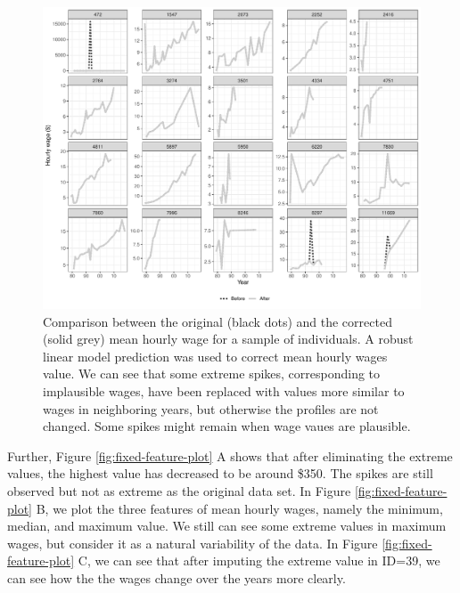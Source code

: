 \documentclass{article}
\begin{document}
\begin{figure}

{\centering \includegraphics[width=0.9\linewidth]{figures/compare-plot-1} 

}

\caption{Comparison between the original (black dots) and the corrected (solid grey) mean hourly wage for a sample of individuals. A robust linear model prediction was used to correct mean hourly wages value. We can see that some extreme spikes, corresponding to implausible wages, have been replaced with values more similar to wages in neighboring years, but otherwise the profiles are not changed. Some spikes might remain when wage vaues are plausible.}\label{fig:compare-plot}
\end{figure}

Further, Figure \ref{fig:fixed-feature-plot} A shows that after eliminating the extreme values, the highest value has decreased to be around \$350. The spikes are still observed but not as extreme as the original data set. In Figure \ref{fig:fixed-feature-plot} B, we plot the three features of mean hourly wages, namely the minimum, median, and maximum value.
We still can see some extreme values in maximum wages, but consider it as a natural variability of the data. In Figure \ref{fig:fixed-feature-plot} C, we can see that after imputing the extreme value in ID=39, we can see how the the wages change over the years more clearly.
\end{document}
